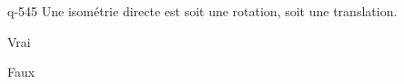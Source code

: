 \begin{truefalse}{q-545}
Une isométrie directe est soit une rotation, soit une translation.
\item* Vrai
\item Faux
\end{truefalse}

